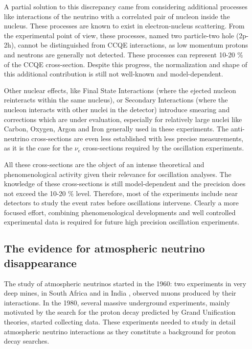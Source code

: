 A partial solution to this discrepancy came from considering additional processes like interactions of the neutrino with a correlated pair of nucleon inside the nucleus. These processes are known to exist in electron-nucleus scattering. From the experimental point of view, these processes, named two particle-two hole (2p-2h), cannot be distinguished from CCQE interactions, as low momentum protons and neutrons are generally not detected. These processes can represent 10-20 \% of the CCQE cross-section. Despite this progress, the normalization and shape of this additional contribution is still not well-known and model-dependent.

Other nuclear effects, like Final State Interactions (where the ejected nucleon reinteracts within the same nucleus), or Secondary Interactions (where the nucleon interacts with other nuclei in the detector) introduce smearing and corrections which are under evaluation, especially for relatively large nuclei like Carbon, Oxygen, Argon and Iron generally used in these experiments. 
The anti-neutrino cross-sections are even less established with less precise measurements, as it is the case for the $\nu_e$ cross-sections required by the oscillation experiments.  

All these cross-sections are the object of an intense theoretical and phenomenological activity \cite{zeller,martini} given their relevance for oscillation analyses. The knowledge of these cross-sections is still model-dependent and the precision does not exceed the 10-20 \% level. Therefore, most of the experiments include near detectors to study the event rates before oscillations intervene. Clearly a more focused effort, combining phenomenological developments and well controlled experimental data is required for future high precision oscillation experiments.


\subsection{The evidence for atmospheric neutrino disappearance}
\label{subsec:atmevidence}

The study of atmospheric neutrinos started in the 1960: two experiments in very deep mines, in South Africa \cite{Reines:1965qk} and in India \cite{Achar:1965ova}, observed muons produced by their interactions. 
In the 1980, several massive underground experiments, mainly motivated by the search for the proton decay predicted by Grand Unification theories, started collecting data. These experiments needed to study in detail atmospheric neutrino interactions as they constitute a background for proton decay searches.

